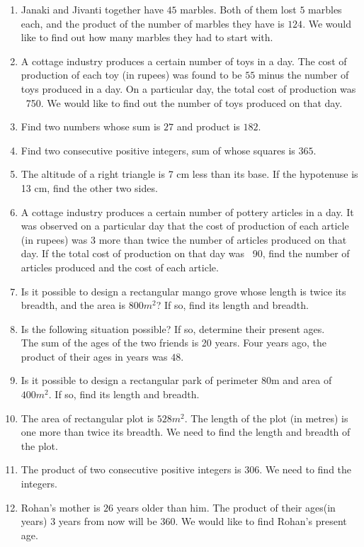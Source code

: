 \begin{enumerate}[label=\thesubsection.\arabic*,ref=\thesubsection.\theenumi,resume*]
\item Janaki and Jivanti together have $45$ marbles. Both of them lost $5$ marbles each, and the product of the number of marbles they have is $124$. We would like to find out how many marbles they had to start with.
\item A cottage industry produces a certain number of toys in a day. The cost of production of each toy (in rupees) was found to be $55$ minus the number of toys produced in a day. On a particular day, the total cost of production was \rupee~750. We would like to find out the number of toys produced on that day.
\item Find two numbers whose sum is $27$ and product is $182$.
\item Find two consecutive  positive integers, sum of whose squares is $365$.
\item  The altitude of a right triangle is 7 cm less than its base. If the hypotenuse is 13 cm, find the other two sides.
\item A cottage industry produces a certain number of pottery articles in a day. It was observed on a particular day that the cost of production of each article (in rupees) was $3$ more than twice the number of articles produced on that day. If the total cost of production on that day was \rupee~90, find the number of articles produced and the cost of each article.
\item Is it possible to design a rectangular mango grove whose length is twice its breadth, and the area is  $800m^2$? If so, find its length and breadth.
\item Is the following situation possible? If so, determine their present ages.
\\ The sum of the ages of the two friends is 20 years. Four years ago, the product of their ages in years was $48$.
\item Is it possible to design a rectangular park of perimeter 80m and area of $400m^2$. If so, find its length and breadth.
\item The area of rectangular plot is $528m^2$. The length of the plot (in metres) is one more than twice its breadth. We need to find the length and breadth of the plot.
\item The product of two consecutive positive integers is $306$. We need to find the integers.
\item Rohan's mother is $26$ years older than him. The product of their ages(in years) $3$ years from now will be $360$. We would like to find Rohan's present age.

\end{enumerate}
